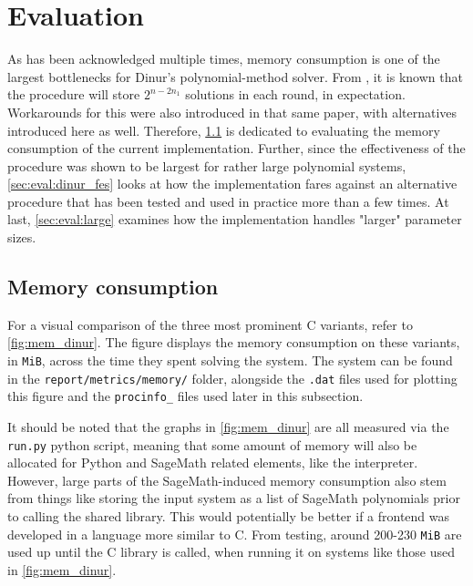 \section{Evaluation} \label{sec:eval}
As has been acknowledged multiple times, memory consumption is one of the largest bottlenecks for Dinur's polynomial-method solver. From \cite{eurocrypt-2021-30841}, it is known that the procedure will store $2^{n - 2n_1}$ solutions in each round, in expectation. Workarounds for this were also introduced in that same paper, with alternatives introduced here as well. Therefore, \cref{sec:eval:mem} is dedicated to evaluating the memory consumption of the current implementation. Further, since the effectiveness of the procedure was shown to be largest for rather large polynomial systems, \cref{sec:eval:dinur_fes} looks at how the implementation fares against an alternative procedure that has been tested and used in practice more than a few times. At last, \cref{sec:eval:large} examines how the implementation handles "larger" parameter sizes.

\subsection{Memory consumption} \label{sec:eval:mem}

For a visual comparison of the three most prominent C variants, refer to \cref{fig:mem_dinur}. The figure displays the memory consumption on these variants, in \texttt{MiB}, across the time they spent solving the system. The system can be found in the \texttt{report/metrics/memory/} folder, alongside the \texttt{.dat} files used for plotting this figure and the \texttt{procinfo\_} files used later in this subsection.

It should be noted that the graphs in \cref{fig:mem_dinur} are all measured via the \texttt{run.py} python script, meaning that some amount of memory will also be allocated for Python and SageMath related elements, like the interpreter. However, large parts of the SageMath-induced memory consumption also stem from things like storing the input system as a list of SageMath polynomials prior to calling the shared library. This would potentially be better if a frontend was developed in a language more similar to C. From testing, around 200-230 \texttt{MiB} are used up until the C library is called, when running it on systems like those used in \cref{fig:mem_dinur}.

